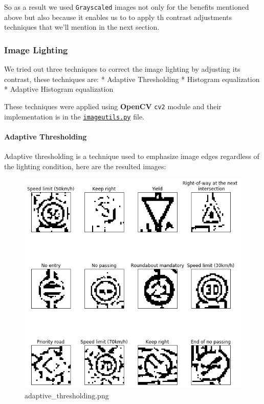 \documentclass[11pt]{article}
\makeatletter
\def\maxwidth{\ifdim\Gin@nat@width>\linewidth\linewidth
    \else\Gin@nat@width\fi}
\let\Oldincludegraphics\includegraphics
\renewcommand{\includegraphics}[1]{\Oldincludegraphics[width=.8\maxwidth]{#1}}
\makeatother
\begin{document}
So as a result we used \texttt{Grayscaled} images not only for the
benefits mentioned above but also because it enables us to to apply th
contrast adjustments techniques that we'll mention in the next section.

    \hypertarget{image-lighting}{%
\subsubsection{Image Lighting}\label{image-lighting}}

We tried out three techniques to correct the image lighting by adjusting
its contrast, these techniques are: * Adaptive Thresholding * Histogram
equalization * Adaptive Histogram equalization

These techniques were applied using \textbf{OpenCV} \texttt{cv2} module
and their implementation is in the
\href{./imageutils.py}{\texttt{imageutils.py}} file.

\hypertarget{adaptive-thresholding}{%
\paragraph{Adaptive Thresholding}\label{adaptive-thresholding}}

Adaptive thresholding is a technique used to emphasize image edges
regardless of the lighting condition, here are the resulted images:

\begin{figure}
\centering
\includegraphics{./assets/adaptive_thresholding.png}
\caption{adaptive\_thresholding.png}
\end{figure}
\end{document}
